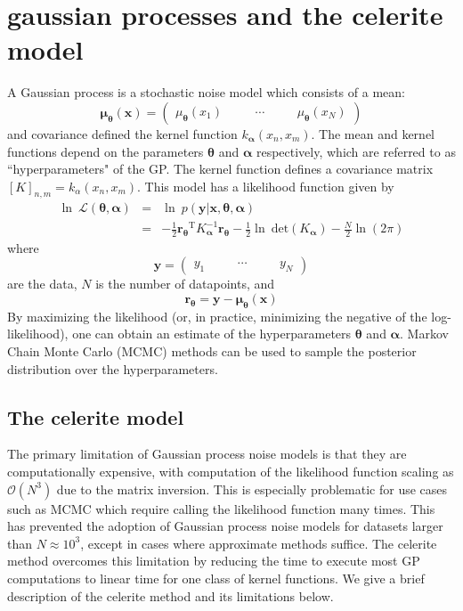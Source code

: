 \documentclass[preprint2]{aastex62}
\newcommand{\project}[1]{\textsf{#1}}
\newcommand{\celerite}{\project{celerite }}
\newcommand{\bvec}[1]{{\ensuremath{\boldsymbol{#1}}}}
\newcommand{\T}{\ensuremath{\mathrm{T}}}
\newcommand{\expandvec}[2]{\left(\begin{array}{ccccc} #1\quad && \cdots\quad && #2 \end{array}\right)}
\begin{document}
\section{gaussian processes and the celerite model}
	A Gaussian process is a stochastic noise model which consists of a mean:
	\begin{equation} 
		\bvec{\mu_\theta}(\bvec{x}) = \expandvec{\mu_\bvec{\theta}(x_1)}
		    {\mu_\bvec{\theta}(x_N)}
	\end{equation}
	and covariance defined the kernel function $k_\bvec{\alpha}(x_n, x_m)$. 
	The mean and kernel functions depend on the parameters 
	$\bvec{\theta}$ and $\bvec{\alpha}$ respectively, which are referred to 
	as ``hyperparameters" of the GP. The kernel function defines a covariance matrix 
	$\left[K\right]_{n, m} = k_\alpha(x_n, x_m)$. This model has a likelihood 
	function given by
	\begin{eqnarray}
		\ln\ \mathcal{L(\bvec{\theta}, \bvec{\alpha})} &=& \ln\ 
		    p(\bvec{y}|\bvec{x}, \bvec{\theta}, \bvec{\alpha}) \\ 
		&=& -\frac{1}{2}\bvec{r_\theta}^\T K_\bvec{\alpha}^{-1}\bvec{r_\theta} 
			-\frac{1}{2}\ln\ \mathrm{det}(K_\bvec{\alpha}) - \frac{N}{2}\ln(2\pi) \nonumber
	\end{eqnarray}
	where 
	\begin{equation}
		\bvec{y} = \expandvec{y_1}{y_N}
	\end{equation}
	are the data, $N$ is the number of datapoints, and
	\begin{equation}
		\bvec{r_\theta} = \bvec{y}-\bvec{\mu_\theta}(\bvec{x})
	\end{equation}
	By maximizing the likelihood (or, in practice, minimizing the negative 
	of the log-likelihood), one can obtain an estimate of the hyperparameters 
	$\bvec{\theta}$ and $\bvec{\alpha}$. Markov Chain Monte Carlo (MCMC) methods can be used to 
	sample the posterior distribution over the hyperparameters. 
	\subsection{The \celerite model}
		The primary limitation of Gaussian process noise models is that they 
		are computationally expensive, with computation of the likelihood function 
		scaling as $\mathcal{O}(N^3)$ due to the matrix inversion. This is especially 
		problematic for use cases such as MCMC which require calling the likelihood 
		function many times. This has prevented the adoption of Gaussian process noise models for 
		datasets larger than $N \approx 10^3$, except in cases where approximate 
		methods suffice. The \celerite method overcomes this limitation by reducing 
		the time to execute most GP computations to linear time for one class of 
		kernel functions\citep{Foreman-Mackey2017}. We give a brief description of the \celerite method 
		and its limitations below. 
		
\end{document}
